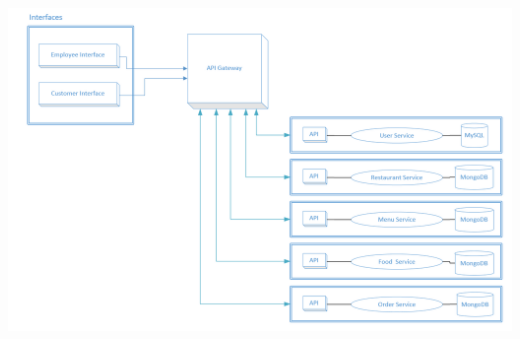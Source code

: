 \documentclass[12pt]{article}
\newenvironment{Figure}
	{\par\medskip\noindent\minipage{\linewidth}}
	{\endminipage\par\medskip}
\begin{document}
\begin{Figure}
\includegraphics[width=\linewidth]{illustrations/Finalapp.png}
\label{fig:applicationdiagram}
\end{Figure}
\end{document}
